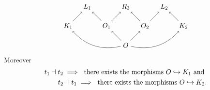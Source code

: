 \begin{lemma}
\begin{enumerate}
    \[
    \begin{tikzpicture} %
      \node (o) at (0,-1) {\(O\)};
      \node (r3) at (0,1) {\(R_3\)};
      \node (o1) at (-1,0) {\(O_1\)};
      \node (o2) at (1,0) {\(O_2\)};
      \node (r1) at (-2,1) {\(L_1\)};
      \node (r2) at (2,1) {\(L_2\)};
      \node (k1) at (-3,0) {\(K_1\)};
      \node (k2) at (3,0) {\(K_2\)};
      \draw [->] (o) -- (o1);
      \draw [->] (o) -- (o2);
      \draw [->] (o1) -- (r3);
      \draw [->] (o2) -- (r3);
      \draw [->] (o1) -- (r1);
      \draw [->] (o2) -- (r2);
      \draw [->] (k1) -- (r1);
      \draw [->] (k2) -- (r2);
      \draw [->] (o) to [bend left] (k1);
      \draw [->] (o) to [bend right] (k2);
    \end{tikzpicture}
    \]
    Moreover
    \begin{align*}
      t_1\dashv t_2\implies\text{ there exists the morphisms }O\hookrightarrow K_1\text{ and }\\
      t_2\dashv t_1\implies\text{ there exists the morphisms }O\hookrightarrow K_2.
    \end{align*}
  \end{enumerate}
\end{lemma}
